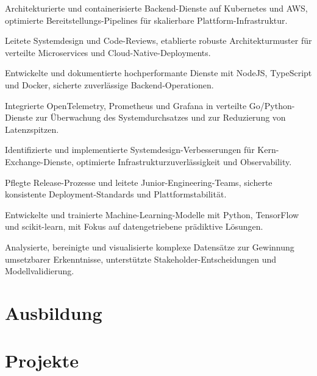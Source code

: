 \documentclass[10pt,a4paper]{resume}
\begin{document}
\bullets
  \item Architekturierte und containerisierte Backend-Dienste auf Kubernetes und AWS, optimierte Bereitstellungs-Pipelines für skalierbare Plattform-Infrastruktur.
  \item Leitete Systemdesign und Code-Reviews, etablierte robuste Architekturmuster für verteilte Microservices und Cloud-Native-Deployments.
  \item Entwickelte und dokumentierte hochperformante Dienste mit NodeJS, TypeScript und Docker, sicherte zuverlässige Backend-Operationen.
\bulletsend
\vspace{1.5pt}
\bullets
  \item Integrierte OpenTelemetry, Prometheus und Grafana in verteilte Go/Python-Dienste zur Überwachung des Systemdurchsatzes und zur Reduzierung von Latenzspitzen.
  \item Identifizierte und implementierte Systemdesign-Verbesserungen für Kern-Exchange-Dienste, optimierte Infrastrukturzuverlässigkeit und Observability.
  \item Pflegte Release-Prozesse und leitete Junior-Engineering-Teams, sicherte konsistente Deployment-Standards und Plattformstabilität.
\bulletsend
\vspace{1.5pt}
\bullets
  \item Entwickelte und trainierte Machine-Learning-Modelle mit Python, TensorFlow und scikit-learn, mit Fokus auf datengetriebene prädiktive Lösungen.
  \item Analysierte, bereinigte und visualisierte komplexe Datensätze zur Gewinnung umsetzbarer Erkenntnisse, unterstützte Stakeholder-Entscheidungen und Modellvalidierung.
\bulletsend
\vspace{1.5pt}

\section{Ausbildung}

\vspace{2pt}

\section{Projekte}
\end{document}
